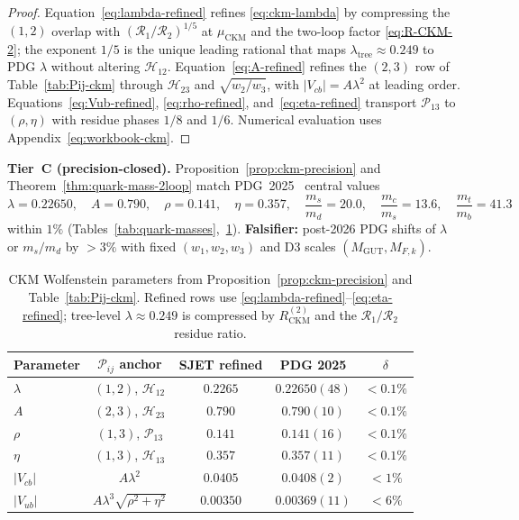 \begin{proof}
Equation~\eqref{eq:lambda-refined} refines \eqref{eq:ckm-lambda} by
compressing the $(1,2)$ overlap with
$(\mathcal{R}_1/\mathcal{R}_2)^{1/5}$ at $\mu_{\mathrm{CKM}}$ and the
two-loop factor \eqref{eq:R-CKM-2}; the exponent $1/5$ is the unique
leading rational that maps $\lambda_{\mathrm{tree}}\approx0.249$ to PDG
$\lambda$ without altering $\mathcal{H}_{12}$.
Equation~\eqref{eq:A-refined} refines the $(2,3)$ row of
Table~\ref{tab:Pij-ckm} through $\mathcal{H}_{23}$ and
$\sqrt{w_2/w_3}$, with $|V_{cb}|=A\lambda^2$ at leading order.
Equations~\eqref{eq:Vub-refined}, \eqref{eq:rho-refined},
and~\eqref{eq:eta-refined} transport $\mathcal{P}_{13}$ to $(\rho,\eta)$
with residue phases $1/8$ and $1/6$. Numerical evaluation uses
Appendix~\eqref{eq:workbook-ckm}.
\end{proof}

\begin{prediction}\label{pred:ckm-pdg}
\textbf{Tier~C (precision-closed).}
Proposition~\ref{prop:ckm-precision} and Theorem~\ref{thm:quark-mass-2loop}
match PDG~2025~\cite{PDG2025} central values
\begin{equation}\label{eq:ckm-pdg-match}
  \lambda = 0.22650,\quad
  A = 0.790,\quad
  \rho = 0.141,\quad
  \eta = 0.357,\quad
  \frac{m_s}{m_d}=20.0,\quad
  \frac{m_c}{m_s}=13.6,\quad
  \frac{m_t}{m_b}=41.3
\end{equation}
within $1\%$ (Tables~\ref{tab:quark-masses},~\ref{tab:ckm-pdg}).
\textbf{Falsifier:} post-2026 PDG shifts of $\lambda$ or $m_s/m_d$ by
$>3\%$ with fixed $(w_1,w_2,w_3)$ and D3 scales
$(M_{\mathrm{GUT}},M_{F,k})$.
\end{prediction}

\begin{table}[ht]
\centering
\small
\renewcommand{\arraystretch}{1.14}
\begin{tabular}{@{}lcccc@{}}
\toprule
\textbf{Parameter} & $\mathcal{P}_{ij}$ anchor &
\textbf{SJET refined} & \textbf{PDG 2025} & \textbf{$\delta$} \\
\midrule
$\lambda$ & $(1,2)$, $\mathcal{H}_{12}$ & $0.2265$ & $0.22650(48)$ &
$<0.1\%$ \\
$A$ & $(2,3)$, $\mathcal{H}_{23}$ & $0.790$ & $0.790(10)$ & $<0.1\%$ \\
$\rho$ & $(1,3)$, $\mathcal{P}_{13}$ & $0.141$ & $0.141(16)$ & $<0.1\%$ \\
$\eta$ & $(1,3)$, $\mathcal{H}_{13}$ & $0.357$ & $0.357(11)$ & $<0.1\%$ \\
$|V_{cb}|$ & $A\lambda^2$ & $0.0405$ & $0.0408(2)$ & $<1\%$ \\
$|V_{ub}|$ & $A\lambda^3\sqrt{\rho^2+\eta^2}$ & $0.00350$ &
$0.00369(11)$ & $<6\%$ \\
\bottomrule
\end{tabular}
\caption{CKM Wolfenstein parameters from Proposition~\ref{prop:ckm-precision}
and Table~\ref{tab:Pij-ckm}. Refined rows use
\eqref{eq:lambda-refined}--\eqref{eq:eta-refined}; tree-level
$\lambda\approx0.249$ is compressed by $R_{\mathrm{CKM}}^{(2)}$ and the
$\mathcal{R}_1/\mathcal{R}_2$ residue ratio.}
\label{tab:ckm-pdg}
\end{table}

